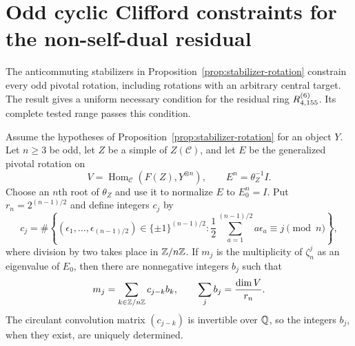 \section{Odd cyclic Clifford constraints for the non-self-dual residual}
\label{sec:r155-odd-clifford}

The anticommuting stabilizers in
Proposition~\ref{prop:stabilizer-rotation} constrain every odd pivotal
rotation, including rotations with an arbitrary central target. The
result gives a uniform necessary condition for the residual ring
$R^{(6)}_{4,155}$. Its complete tested range passes this condition.

\begin{theorem}
\label{thm:odd-cyclic-clifford}
Assume the hypotheses of Proposition~\ref{prop:stabilizer-rotation} for
an object $Y$. Let $n\ge3$ be odd, let $Z$ be a simple of
$Z(\mathcal C)$, and let $E$ be the generalized pivotal rotation on
\[
 V=\operatorname{Hom}_{\mathcal C}(F(Z),Y^{\otimes n}),
 \qquad E^n=\theta_Z^{-1}I.
\]
Choose an $n$th root of $\theta_Z$ and use it to normalize $E$ to
$E_0^n=I$. Put $r_n=2^{(n-1)/2}$ and define integers $c_j$ by
\[
 c_j=\#\left\{(\epsilon_1,\ldots,\epsilon_{(n-1)/2})\in\{\pm1\}^{(n-1)/2}:
 \frac12\sum_{a=1}^{(n-1)/2}a\epsilon_a\equiv j\pmod n\right\},
\]
where division by two takes place in $\mathbb Z/n\mathbb Z$. If $m_j$ is the
multiplicity of $\zeta_n^j$ as an eigenvalue of $E_0$, then there are
nonnegative integers $b_j$ such that
\begin{equation}\label{eq:odd-clifford-convolution}
 m_j=\sum_{k\in\mathbb Z/n\mathbb Z}c_{j-k}b_k,
 \qquad \sum_jb_j=\frac{\dim V}{r_n}.
\end{equation}
The circulant convolution matrix $(c_{j-k})$ is invertible over $\mathbb Q$,
so the integers $b_j$, when they exist, are uniquely determined.
\end{theorem}
